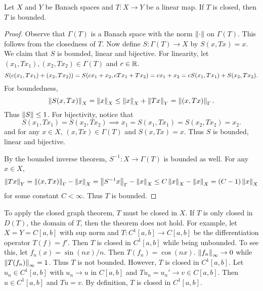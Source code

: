 \begin{theorem}
    Let $X$ and $Y$ be Banach spaces and $T:X\to Y$ be a linear map. If $T$ is 
    closed, then $T$ is bounded.
\end{theorem}
\begin{proof}
    Observe that $\Gamma(T)$ is a Banach space with the norm $\left\lVert {\cdot} \right\rVert$ on 
    $\Gamma(T)$. This follows from the closedness of $T$. Now define $S:\Gamma(T) 
    \to X$ by $S(x,Tx) = x$. We claim that $S$ is bounded, linear and bijective. 
    For linearity, let $(x_1,Tx_1), (x_2,Tx_2)\in \Gamma(T)$ and $c\in\mathbb{R}$. 
    \begin{equation*}
        S\pth{c(x_1,Tx_1) + (x_2,Tx_2)} = S\pth{cx_1 + x_2, cTx_1 + Tx_2} 
        = cx_1 + x_2 = cS(x_1,Tx_1) + S(x_2,Tx_2).
    \end{equation*}
    For boundedness, 
    \begin{equation*}
        \left\lVert {S(x,Tx)} \right\rVert_X = \left\lVert {x} \right\rVert_X \leq \left\lVert {x} \right\rVert_X + \left\lVert {Tx} \right\rVert_Y = \left\lVert {(x,Tx)} \right\rVert_\Gamma. 
    \end{equation*}
    Thus $\left\lVert {S} \right\rVert \leq 1$. For bijectivity, notice that 
    \begin{equation*}
        S(x_1,Tx_1) = S(x_2,Tx_2) \implies x_1 = S(x_1,Tx_1) = S(x_2,Tx_2) = x_2.
    \end{equation*}
    and for any $x\in X$, $(x,Tx)\in\Gamma(T)$ and $S(x,Tx) = x$. Thus $S$ is 
    bounded, linear and bijective.

    By the bounded inverse theorem, $S^{-1}:X\to\Gamma(T)$ is bounded as well. For 
    any $x\in X$, 
    \begin{equation*}
        \left\lVert {Tx} \right\rVert_Y = \left\lVert {(x,Tx)} \right\rVert_\Gamma - \left\lVert {x} \right\rVert_X 
        = \left\lVert {S^{-1}x} \right\rVert_\Gamma - \left\lVert {x} \right\rVert_X 
        \leq C\left\lVert {x} \right\rVert_X - \left\lVert {x} \right\rVert_X = (C-1)\left\lVert {x} \right\rVert_X
    \end{equation*}
    for some constant $C<\infty$. Thus $T$ is bounded.
\end{proof}
\begin{remark}
    To apply the closed graph theorem, $T$ must be closed 
    in $X$. If $T$ is only closed in $D(T)$, the domain of $T$, 
    then the theorem does not hold. For example, let $X = Y = C[a,b]$ 
    with sup norm and $T:C^1[a,b]\to C[a,b]$ be the differentiation operator 
    $T(f) = f'$. Then $T$ is closed in $C^1[a,b]$ while being unbounded. 
    To see this, let $f_n(x) = \sin(nx)/n$. Then $T(f_n) = \cos(nx)$. 
    $\left\lVert {f_n} \right\rVert_\infty \to 0$ while $\left\lVert {T(f_n)} \right\rVert_\infty = 1$. 
    Thus $T$ is not bounded. However, $T$ is closed in $C^1[a,b]$. 
    Let $u_n\in C^1[a,b]$ with $u_n\to u$ in $C[a,b]$ and $Tu_n = u_n'\to v\in C[a,b]$. 
    Then $u\in C^1[a,b]$ and $Tu = v$. By definition, 
    $T$ is closed in $C^1[a,b]$. 
\end{remark}

